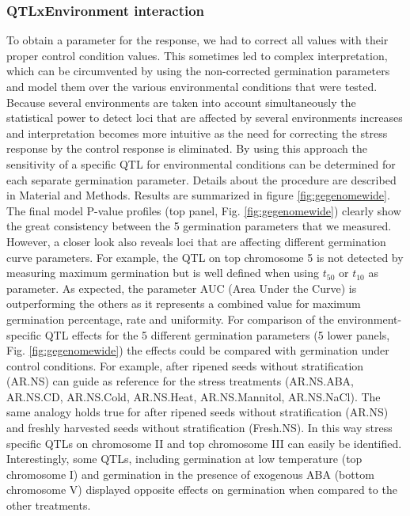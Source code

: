 \subsubsection{QTLxEnvironment interaction}
To obtain a parameter for the response, we had to correct all values with their proper control condition 
values. This sometimes led to complex interpretation, which can be circumvented by using the non-corrected 
germination parameters and model them over the various environmental conditions that were tested. Because 
several environments are taken into account simultaneously the statistical power to detect loci that are 
affected by several environments increases and interpretation becomes more intuitive as the need for 
correcting the stress response by the control response is eliminated. By using this approach the 
sensitivity of a specific QTL for environmental conditions can be determined for each separate germination 
parameter. Details about the procedure are described in Material and Methods. Results are summarized in 
figure \ref{fig:gegenomewide}. The final model P-value profiles (top panel, Fig. \ref{fig:gegenomewide}) clearly show the great consistency 
between the 5 germination parameters that we measured. However, a closer look also reveals loci that 
are affecting different germination curve parameters. For example, the QTL on top chromosome 5 is not 
detected by measuring maximum germination but is well defined when using $t_{50}$ or $t_{10}$ as parameter. As 
expected, the parameter AUC (Area Under the Curve) is outperforming the others as it represents a 
combined value for maximum germination percentage, rate and uniformity. For comparison of the 
environment-specific QTL effects for the 5 different germination parameters (5 lower panels, Fig. \ref{fig:gegenomewide}) 
the effects could be compared with germination under control conditions. For example, after ripened 
seeds without stratification (AR.NS) can guide as reference for the stress treatments (AR.NS.ABA, AR.NS.CD, 
AR.NS.Cold, AR.NS.Heat, AR.NS.Mannitol, AR.NS.NaCl). The same analogy holds true for after ripened seeds
without stratification (AR.NS) and freshly harvested seeds without stratification (Fresh.NS). In this way 
stress specific QTLs on chromosome II and top chromosome III can easily be identified. Interestingly, some 
QTLs, including germination at low temperature (top chromosome I) and germination in the presence of 
exogenous ABA (bottom chromosome V) displayed opposite effects on germination when compared to the 
other treatments.

